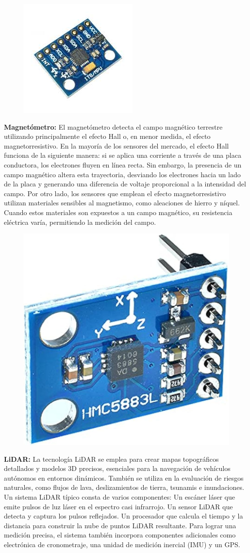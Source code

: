 \begin{figure}[h]
	\centering
	\includegraphics[width=0.3\linewidth, height=0.3\textheight]{img/acelerometro}
	\caption{}
	\label{fig:acelerometro}
\end{figure}

\textbf{Magnetómetro:}
El magnetómetro detecta el campo magnético terrestre utilizando principalmente el efecto Hall o, en menor medida, el efecto magnetorresistivo. En la mayoría de los sensores del mercado, el efecto Hall funciona de la siguiente manera: si se aplica una corriente a través de una placa conductora, los electrones fluyen en línea recta. Sin embargo, la presencia de un campo magnético altera esta trayectoria, desviando los electrones hacia un lado de la placa y generando una diferencia de voltaje proporcional a la intensidad del campo. Por otro lado, los sensores que emplean el efecto magnetorresistivo utilizan materiales sensibles al magnetismo, como aleaciones de hierro y níquel. Cuando estos materiales son expuestos a un campo magnético, su resistencia eléctrica varía, permitiendo la medición del campo.
\vspace{10pt}  %

\begin{figure}[h]
	\centering
	\includegraphics[width=0.3\linewidth]{img/magneto}
	\caption{}
	\label{fig:magneto}
\end{figure}

\vspace{20pt}  %
\textbf{LiDAR:}
La tecnología LiDAR se emplea para crear mapas topográficos detallados y modelos 3D precisos, esenciales para la navegación de vehículos autónomos en entornos dinámicos. También se utiliza en la evaluación de riesgos naturales, como flujos de lava, deslizamientos de tierra, tsunamis e inundaciones.
Un sistema LiDAR típico consta de varios componentes:
Un escáner láser que emite pulsos de luz láser en el espectro casi infrarrojo.
Un sensor LiDAR que detecta y captura los pulsos reflejados.
Un procesador que calcula el tiempo y la distancia para construir la nube de puntos LiDAR resultante.
Para lograr una medición precisa, el sistema también incorpora componentes adicionales como electrónica de cronometraje, una unidad de medición inercial (IMU) y un GPS.
\vspace{10pt}  %

